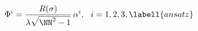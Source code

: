 \begin{equation}
\Phi^i = {R(\sigma)\over\lambda\sqrt{\NN^2-1}}\,\alpha^i,\ \
i=1,2,3,\labell{ansatz}
\end{equation}

